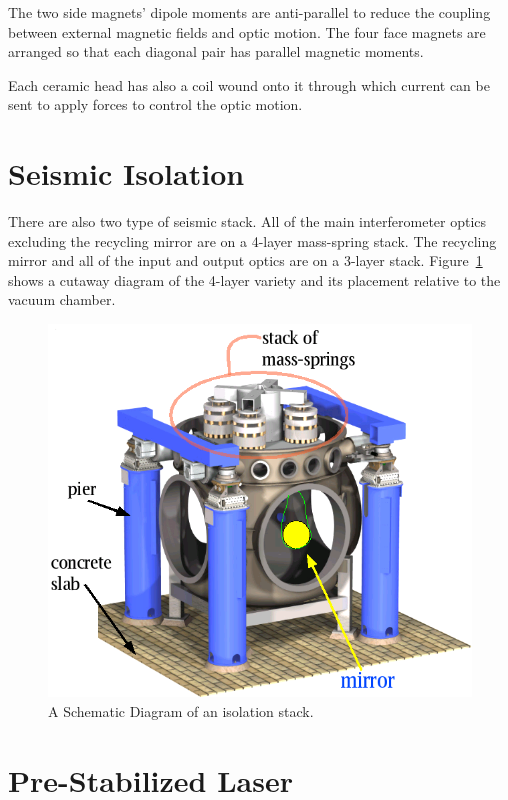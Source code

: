 The two side magnets' dipole moments are anti-parallel to reduce the coupling between
external magnetic fields and optic motion. The four face magnets are arranged so
that each diagonal pair has parallel magnetic moments.

Each ceramic head has also a coil wound onto it through which current can be sent
to apply forces to control the optic motion.

\section{Seismic Isolation}

There are also two type of seismic stack. All of the main interferometer optics
excluding the recycling mirror are on a 4-layer mass-spring stack. The
recycling mirror and all of the input and output optics are on a 3-layer
stack. Figure~\ref{fig:BSC} shows a cutaway diagram of the 4-layer variety
and its placement relative to the vacuum chamber.

\begin{figure}[!h]
\centerline{
  \includegraphics[angle=0,width=6.5in]{Figures/AppG/BSC.png}}
\caption[BSC Stack]{A Schematic Diagram of an isolation stack.}
\label{fig:BSC}
\end{figure}



\section{Pre-Stabilized Laser}
\label{sec:PSL}

